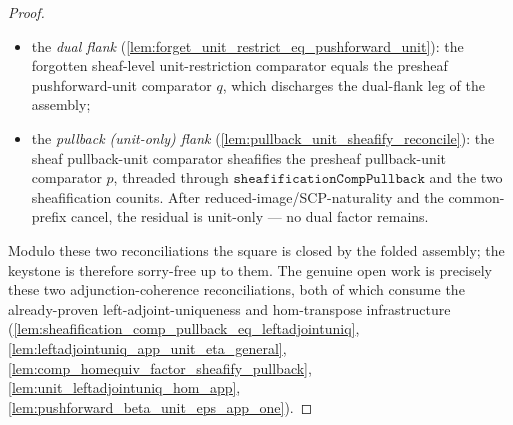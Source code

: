 \begin{proof}
  \begin{itemize}
    \item the \emph{dual flank} (\cref{lem:forget_unit_restrict_eq_pushforward_unit}): the
      forgotten sheaf-level unit-restriction comparator equals the presheaf pushforward-unit
      comparator \(q\), which discharges the dual-flank leg of the assembly;
    \item the \emph{pullback (unit-only) flank} (\cref{lem:pullback_unit_sheafify_reconcile}): the
      sheaf pullback-unit comparator sheafifies the presheaf pullback-unit comparator \(p\), threaded
      through \(\mathtt{sheafificationCompPullback}\) and the two sheafification counits. After
      reduced-image/SCP-naturality and the common-prefix cancel, the residual is unit-only --- no
      dual factor remains.
  \end{itemize}

  Modulo these two reconciliations the square is closed by the folded assembly; the keystone is
  therefore sorry-free up to them. The genuine open work is precisely these two adjunction-coherence
  reconciliations, both of which consume the already-proven left-adjoint-uniqueness and
  hom-transpose infrastructure (\cref{lem:sheafification_comp_pullback_eq_leftadjointuniq},
  \cref{lem:leftadjointuniq_app_unit_eta_general}, \cref{lem:comp_homequiv_factor_sheafify_pullback},
  \cref{lem:unit_leftadjointuniq_hom_app}, \cref{lem:pushforward_beta_unit_eps_app_one}).
\end{proof}

